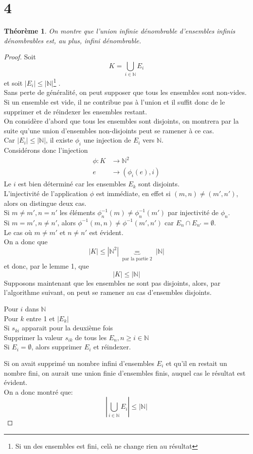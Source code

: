 \documentclass[11pt, a4paper, twoside]{article}
\newtheorem{theorem}{Théorème}
\begin{document}
\section*{4}
\begin{theorem}
	On montre que l'union infinie dénombrable d'ensembles infinis dénombrables est, au plus, infini dénombrable.
\end{theorem}
\begin{proof}
Soit
\[ 
K = \bigcup_{i \in \mathbb{N}} E_i
\]
et soit $|E_i| \leq |\mathbb{N}|$\footnote{Si un des ensembles est fini, celà ne change rien au résultat} .\\
Sans perte de généralité, on peut supposer que tous les ensembles sont non-vides. Si un ensemble est vide, il ne contribue pas à l'union et il suffit donc de le supprimer et de réindexer les ensembles restant.\\
On considère d'abord que tous les ensembles sont disjoints, on montrera par la suite qu'une union d'ensembles non-disjoints peut se ramener à ce cas.\\
Car $|E_i| \leq |\mathbb{N}|$, il existe $\phi_i$ une injection de $E_i$ vers $\mathbb{N}$.\\
Considérons donc l'injection
\begin{align*}
	\phi : K &\to \mathbb{N}^{2}\\
	e &\to (\phi_i(e),i) 
\end{align*}
Le $i$ est bien déterminé car les ensembles $E_k$ sont disjoints.\\
L'injectivité de l'application $\phi$ est immédiate, en effet si $( m,n )\neq (m',n')$, alors on distingue deux cas.\\
Si $m\neq m', n = n'$ les éléments $\phi^{-1}_n(m) \neq \phi^{-1}_n(m')$ par injectivité de $\phi_n$.\\
Si $m=m', n\neq n'$, alors $\phi^{-1}(m,n) \neq \phi^{-1}(m',n')$ car $E_n \cap E_{n'} = \emptyset.$\\
Le cas où $m\neq m'$ et $n\neq n'$ est évident.\\
On a donc que
\[ 
|K| \leq |\mathbb{N}^{2}| \underbrace{=}_{ \text{ par la partie 2 } } |\mathbb{N}|
\]
et donc, par le lemme 1, que
 \[ 
|K| \leq |\mathbb{N}|
\]
Supposons maintenant que les ensembles ne sont pas disjoints, alors, par l'algorithme suivant, on peut se ramener au cas d'ensembles disjoints.
\begin{flushleft}
Pour $i$ dans $\mathbb{N}$ \\
\quad Pour $k$ entre 1 et $|E_k|$ \\
\quad \quad Si $s_{ki}$ apparait pour la deuxième fois\\
\quad \quad \quad Supprimer la valeur $s_{ik} $ de tous les $E_n, n\geq i \in \mathbb{N}$\\
\quad \quad Si $E_i = \emptyset$, alors supprimer $E_i$ et réindexer.
\end{flushleft}
Si on avait supprimé un nombre infini d'ensembles $E_i$ et qu'il en restait un nombre fini, on aurait une union finie d'ensembles finis, auquel cas le résultat est évident.\\
On a donc montré que:
\[ 
|\bigcup_{i \in \mathbb{N}} E_i| \leq |\mathbb{N}|
\]
\end{proof}
\end{document}
